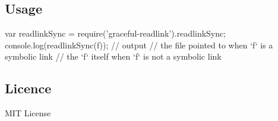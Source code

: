 \href{https://www.npmjs.org/package/graceful-readlink}{\tt } \href{https://www.npmjs.org/package/graceful-readlink}{\tt }

\subsection*{Usage}


\begin{DoxyCode}
var readlinkSync = require('graceful-readlink').readlinkSync;
console.log(readlinkSync(f));
// output
//  the file pointed to when `f` is a symbolic link
//  the `f` itself when `f` is not a symbolic link
\end{DoxyCode}
 \subsection*{Licence}

M\+IT License 